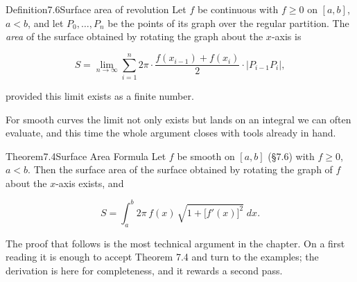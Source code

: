 \documentclass[a4paper,12pt,oneside]{memoir}
\begin{document}
\begin{envdefinition}{Definition}{7.6}{Surface area of revolution}
Let \(f\) be continuous with \(f \ge 0\) on \([a, b]\), \(a < b\), and let \(P_0, \dots, P_n\) be the points of its graph over the regular partition. The \emph{area} of the surface obtained by rotating the graph about the \(x\)-axis is

\[ S = \lim_{n \to \infty} \sum_{i=1}^{n} 2\pi\cdot\frac{f(x_{i-1}) + f(x_i)}{2}\cdot\bigl\lvert P_{i-1}P_i\bigr\rvert, \]

provided this limit exists as a finite number.
\end{envdefinition}
For smooth curves the limit not only exists but lands on an integral we can often evaluate, and this time the whole argument closes with tools already in hand.

\begin{envtheorem}{Theorem}{7.4}{Surface Area Formula}
Let \(f\) be smooth on \([a, b]\) (§7.6) with \(f \ge 0\), \(a < b\). Then the surface area of the surface obtained by rotating the graph of \(f\) about the \(x\)-axis exists, and

\[ S = \int_{a}^{b} 2\pi\,f(x)\,\sqrt{1 + \bigl[f'(x)\bigr]^{2}}\;dx. \]
\end{envtheorem}
The proof that follows is the most technical argument in the chapter. On a first reading it is enough to accept Theorem 7.4 and turn to the examples; the derivation is here for completeness, and it rewards a second pass.
\end{document}
